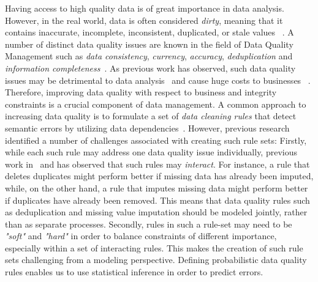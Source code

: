 Having access to high quality data is of great importance in data analysis. However, in the real world, data is often considered \textit{dirty}, meaning that it contains inaccurate, incomplete, inconsistent, duplicated, or stale values ~\cite{chu2004blissful}. A number of distinct data quality issues are known in the field of Data Quality Management such as \textit{data consistency}, \textit{currency}, \textit{accuracy}, \textit{deduplication} and \textit{information completeness}~\cite{fan2012foundations}. As previous work has observed, such data quality issues may be detrimental to data analysis~\cite{national2013Frontiers,Fan:2008:CFD:1366102.1366103} and cause huge costs to businesses ~\cite{waynew.eckerson2002}. Therefore, improving data quality with respect to business and integrity constraints is a crucial component of data management. 
A common approach to increasing data quality is to formulate a set of \textit{data cleaning rules} that detect semantic errors by utilizing data dependencies~\cite{fan2012foundations, Arasu:2009:LDC:1546683.1547340, Dallachiesa:2013:NCD:2463676.2465327, llunaticVDLB2013b}. However, previous research identified a number of challenges associated with creating such rule sets: 
Firstly, while each such rule may address one data quality issue individually, previous work in~\cite{fan2012foundations} and \cite{Fan:2014:IRM:2628135.2567657} has observed that such rules may \textit{interact}. For instance, a rule that deletes duplicates might perform better if missing data has already been imputed, while, on the other hand, a rule that imputes missing data might perform better if duplicates have already been removed. This means that data quality rules such as deduplication and missing value imputation should be modeled jointly, rather than as separate processes.
Secondly, rules in such a rule-set may need to be \textit{"soft"} and \textit{"hard"} in order to balance constraints of different importance, especially within a set of interacting rules. This makes the creation of such rule sets challenging from a modeling perspective. Defining probabilistic data quality rules enables us to use statistical inference in order to predict errors. 

